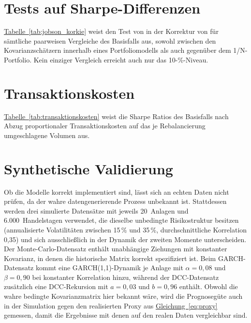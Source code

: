 \section{Tests auf Sharpe-Differenzen}\label{sec:anhang_sharpetests}
\hyperref[tab:jobson_korkie]{Tabelle~\ref*{tab:jobson_korkie}} weist den Test von \textcite{jobson1981} in der Korrektur von \textcite{memmel2003} für sämtliche paarweisen Vergleiche des Basisfalls aus, sowohl zwischen den Kovarianzschätzern innerhalb eines Portfoliomodells als auch gegenüber dem 1/N-Portfolio.
Kein einziger Vergleich erreicht auch nur das 10-\%-Niveau.



\section{Transaktionskosten}\label{sec:anhang_kosten}
\hyperref[tab:transaktionskosten]{Tabelle~\ref*{tab:transaktionskosten}} weist die Sharpe Ratios des Basisfalls nach Abzug proportionaler Transaktionskosten auf das je Rebalancierung umgeschlagene Volumen aus.



\section{Synthetische Validierung}\label{sec:anhang_synth}
Ob die Modelle korrekt implementiert sind, lässt sich an echten Daten nicht prüfen, da der wahre datengenerierende Prozess unbekannt ist.
Stattdessen werden drei simulierte Datensätze mit jeweils 20~Anlagen und 6.000~Handelstagen verwendet, die dieselbe unbedingte Risikostruktur besitzen (annualisierte Volatilitäten zwischen 15\,\% und 35\,\%, durchschnittliche Korrelation 0,35) und sich ausschließlich in der Dynamik der zweiten Momente unterscheiden.
Der Monte-Carlo-Datensatz enthält unabhängige Ziehungen mit konstanter Kovarianz, in denen die historische Matrix korrekt spezifiziert ist.
Beim GARCH-Datensatz kommt eine GARCH(1,1)-Dynamik je Anlage mit $\alpha = 0{,}08$ und $\beta = 0{,}90$ bei konstanter Korrelation hinzu, während der DCC-Datensatz zusätzlich eine DCC-Rekursion mit $a = 0{,}03$ und $b = 0{,}96$ enthält.
Obwohl die wahre bedingte Kovarianzmatrix hier bekannt wäre, wird die Prognosegüte auch in der Simulation gegen den realisierten Proxy aus \hyperref[eq:proxy]{Gleichung~\ref*{eq:proxy}} gemessen, damit die Ergebnisse mit denen auf den realen Daten vergleichbar sind.

